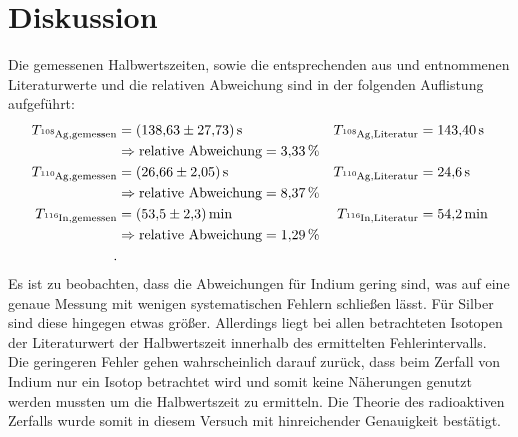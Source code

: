 \section{Diskussion}
\label{sec:Diskussion}
Die gemessenen Halbwertszeiten, sowie die entsprechenden aus \cite{In} und \cite{Ag} entnommenen Literaturwerte und
die relativen Abweichung sind in der folgenden Auflistung aufgeführt:
\begin{align*}
  T_{\ce{^{108}Ag},\text{gemessen}} &= \SI{138.63 \pm 27.73}{\second} &   T_{\ce{^{108}Ag},\text{Literatur}} &= \SI{143.40}{\second} \\
  & \Rightarrow \text{relative Abweichung} = \SI{3.33}{\percent} \\
  T_{\ce{^{110}Ag},\text{gemessen}} &= \SI{26.66 \pm 2.05}{\second}  &   T_{\ce{^{110}Ag},\text{Literatur}} &= \SI{24.6}{\second} \\
  & \Rightarrow \text{relative Abweichung} = \SI{8.37}{\percent} \\
  T_{\ce{^{116}In},\text{gemessen}} &= \SI{53.5 \pm 2.3}{\minute}  &   T_{\ce{^{116}In},\text{Literatur}} &= \SI{54.2}{\minute} \\
  & \Rightarrow \text{relative Abweichung} = \SI{1.29}{\percent} \\ .
\end{align*}
Es ist zu beobachten, dass die Abweichungen für Indium gering sind, was auf eine genaue Messung mit wenigen systematischen Fehlern schließen lässt.
Für Silber sind diese hingegen etwas größer.
Allerdings liegt bei allen betrachteten Isotopen der Literaturwert der Halbwertszeit innerhalb des ermittelten Fehlerintervalls.
Die geringeren Fehler gehen wahrscheinlich darauf zurück, dass beim Zerfall von Indium nur ein Isotop betrachtet wird und somit keine Näherungen genutzt
werden mussten um die Halbwertszeit zu ermitteln.
Die Theorie des radioaktiven Zerfalls wurde somit in diesem Versuch mit hinreichender Genauigkeit bestätigt.
